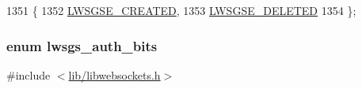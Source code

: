 \begin{DoxyCode}
1351                   \{
1352         \hyperlink{group__generic-sessions_ggaa93946b3d921072209d5cd8cdfa5332ea596010a165bf13473c5eea3a34cd4308}{LWSGSE\_CREATED}, 
1353         \hyperlink{group__generic-sessions_ggaa93946b3d921072209d5cd8cdfa5332ead908cdc5689c5d22c9d3c8934e94dcde}{LWSGSE\_DELETED}  
1354 \};
\end{DoxyCode}
\subsubsection[{\texorpdfstring{lwsgs\+\_\+auth\+\_\+bits}{lwsgs\_auth\_bits}}]{\setlength{\rightskip}{0pt plus 5cm}enum {\bf lwsgs\+\_\+auth\+\_\+bits}}\hypertarget{group__generic-sessions_ga7c2dc7bfb4ccb91c5d771f9e9ea237e1}{}\label{group__generic-sessions_ga7c2dc7bfb4ccb91c5d771f9e9ea237e1}


{\ttfamily \#include $<$\hyperlink{libwebsockets_8h}{lib/libwebsockets.\+h}$>$}


